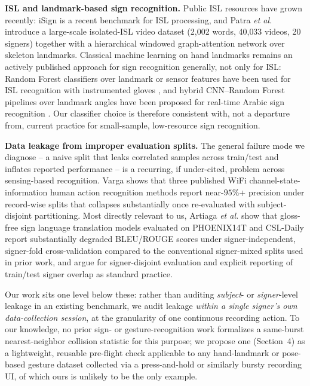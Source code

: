 \documentclass[runningheads]{llncs}
\begin{document}
\textbf{ISL and landmark-based sign recognition.} Public ISL resources
have grown recently: iSign \cite{isign2024} is a recent benchmark for ISL
processing, and Patra \emph{et al.} \cite{hwgat2024} introduce a
large-scale isolated-ISL video dataset (2{,}002 words, 40{,}033 videos, 20
signers) together with a hierarchical windowed graph-attention network
over skeleton landmarks. Classical machine learning on hand landmarks
remains an actively published approach for sign recognition generally, not
only for ISL: Random Forest classifiers over landmark or sensor features
have been used for ISL recognition with instrumented gloves
\cite{potluri2021}, and hybrid CNN--Random Forest pipelines over landmark
angles have been proposed for real-time Arabic sign recognition
\cite{arabicslr2024}. Our classifier choice is therefore consistent with,
not a departure from, current practice for small-sample, low-resource sign
recognition.

\textbf{Data leakage from improper evaluation splits.} The general failure
mode we diagnose -- a naive split that leaks correlated samples across
train/test and inflates reported performance -- is a recurring, if
under-cited, problem across sensing-based recognition. Varga
\cite{varga2024} shows that three published WiFi channel-state-information
human action recognition methods report near-$95\%$+ precision under
record-wise splits that collapses substantially once re-evaluated with
subject-disjoint partitioning. Most directly relevant to us, Artiaga
\emph{et al.} \cite{signerdep2025} show that gloss-free sign language
translation models evaluated on PHOENIX14T and CSL-Daily report
substantially degraded BLEU/ROUGE scores under signer-independent,
signer-fold cross-validation compared to the conventional signer-mixed
splits used in prior work, and argue for signer-disjoint evaluation and
explicit reporting of train/test signer overlap as standard practice.

Our work sits one level below these: rather than auditing
\emph{subject}- or \emph{signer}-level leakage in an existing benchmark,
we audit leakage \emph{within a single signer's own data-collection
session}, at the granularity of one continuous recording action. To our
knowledge, no prior sign- or gesture-recognition work formalizes a
same-burst nearest-neighbor collision statistic for this purpose; we
propose one (Section~4) as a lightweight, reusable pre-flight check
applicable to any hand-landmark or pose-based gesture dataset collected
via a press-and-hold or similarly bursty recording UI, of which ours is
unlikely to be the only example.
\end{document}
